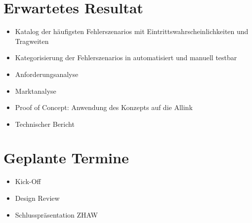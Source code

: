\section{Erwartetes Resultat}
\label{sec:anhang_erwartetes_resultat}
\begin{itemize}
  \item Katalog der häufigsten Fehlerszenarios mit Eintrittswahrscheinlichkeiten und Tragweiten
  \item Kategorisierung der Fehlerszenarios in automatisiert und manuell testbar
  \item Anforderungsanalyse
  \item Marktanalyse
  \item Proof of Concept: Anwendung des Konzepts auf die Allink
  \item Technischer Bericht
\end{itemize}

\section{Geplante Termine}
\label{sec:anhang_geplante_termine}
\begin{itemize}
  \item Kick-Off
  \item Design Review
  \item Schlusspräsentation ZHAW
\end{itemize}
